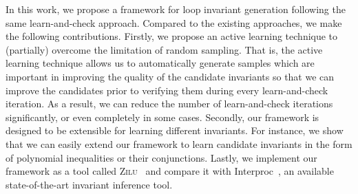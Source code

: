 In this work, we propose a framework for loop invariant generation following the same learn-and-check approach. %
Compared to the existing approaches, we make the following contributions. Firstly, we propose an active learning technique to (partially) overcome the limitation of random sampling. That is, the active learning technique allows us to automatically generate samples which are important in improving the quality of the candidate invariants so that we can improve the candidates prior to verifying them during every learn-and-check iteration. As a result, we can reduce the number of learn-and-check iterations significantly, or even completely in some cases.
Secondly, our framework is designed to be extensible for learning different invariants. For instance, we show that we can easily extend our framework to learn candidate invariants in the form of polynomial inequalities or their conjunctions.
Lastly, we implement our framework as a tool called \textsc{Zilu}~\cite{zilu:repo}
    and compare it with Interproc~\cite{jeannet2010interproc}, %
an available state-of-the-art invariant inference tool.
